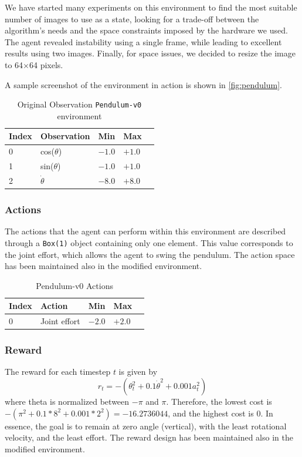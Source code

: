 We have started many experiments on this environment to find the most suitable number of images to use as a state, looking for a trade-off between the algorithm’s needs and the space constraints imposed by the hardware we used. The agent revealed instability using a single frame, while leading to excellent results using two images. Finally, for space issues, we decided to resize the image to 64$\times$64 pixels.

A sample screenshot of the environment in action is shown in \vref{fig:pendulum}.

\begin{table}[!h]
	\centering
	\caption{Original Observation \texttt{Pendulum-v0} environment}
	\label{table:pendulum_obs}
	\begin{tabular}{@{}lllll@{}}
		\toprule
		Index & Observation    & Min    & Max    \\ \midrule
		0     & cos($\theta$)  & $-1.0$ & $+1.0$ \\
		1     & sin($\theta$)  & $-1.0$ & $+1.0$ \\
		2     & $\dot{\theta}$ & $-8.0$ & $+8.0$ \\
		\bottomrule
	\end{tabular}
\end{table}

\subsubsection{Actions}

The actions that the agent can perform within this environment are described through a \texttt{Box(1)} object containing only one element. This value corresponds to the joint effort, which allows the agent to swing the pendulum. The action space has been maintained also in the modified environment.

\begin{table}[!h]
	\centering
	\caption{Pendulum-v0 Actions }
	\label{mountain_action}
	\begin{tabular}{@{}lllll@{}}
		\toprule
		Index & Action       & Min    & Max    \\ \midrule
		0     & Joint effort & $-2.0$ & $+2.0$ \\
		\bottomrule
	\end{tabular}
\end{table}

\subsubsection{Reward}
The reward for each timestep $t$ is given by \[r_t = -(\theta_t^2 + 0.1 \dot{\theta}^2 + 0.001 a_t^2)\]
where theta is normalized between $-\pi$ and $\pi$. Therefore, the lowest cost is $-(\pi^2 + 0.1*8^2 + 0.001*2^2) = -16.2736044$, and the highest cost is $0$. In essence, the goal is to remain at zero angle (vertical), with the least rotational velocity, and the least effort.
The reward design has been maintained also in the modified environment.

